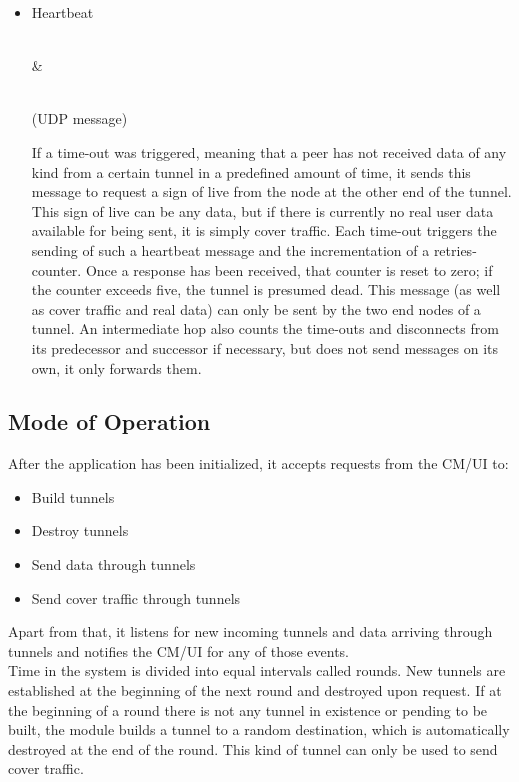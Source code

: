 \documentclass{article}
\begin{document}
\begin{itemize}
		Contains cover traffic of a specified size, which was requested to be sent by the local CM/UI module. Since it contains no meaningful data, the message is discarded upon reception. \\
\hbox{} \\
	\item Heartbeat \\[8pt]
		\begin{bytefield}[bitwidth=1.0em]{32}
			 \\
			& 
		\end{bytefield} \\
		(UDP message)

		If a time-out was triggered, meaning that a peer has not received data of any kind from a certain tunnel in a predefined amount of time, it sends this message to request a sign of live from the node at the other end of the tunnel. This sign of live can be any data, but if there is currently no real user data available for being sent, it is simply cover traffic.
		Each time-out triggers the sending of such a heartbeat message and the incrementation of a retries-counter. Once a response has been received, that counter is reset to zero; if the counter exceeds five, the tunnel is presumed dead. This message (as well as cover traffic and real data) can only be sent by the two end nodes of a tunnel. An intermediate hop also counts the time-outs and disconnects from its predecessor and successor if necessary, but does not send messages on its own, it only forwards them.
\end{itemize}
	
	\subsection{Mode of Operation}
	After the application has been initialized, it accepts requests from the CM/UI to:
	\begin{itemize}
		\item Build tunnels
		\item Destroy tunnels
		\item Send data through tunnels
		\item Send cover traffic through tunnels
	\end{itemize}
	Apart from that, it listens for new incoming tunnels and data arriving through tunnels and notifies the CM/UI for any of those events. \\
	Time in the system is divided into equal intervals called rounds. New tunnels are established at the beginning of the next round and destroyed upon request. If at the beginning of a round there is not any tunnel in existence or pending to be built, the module builds a tunnel to a random destination, which is automatically destroyed at the end of the round. This kind of tunnel can only be used to send cover traffic.
	
\end{document}
